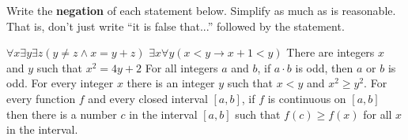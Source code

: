 \documentclass[11pt]{exam}
\def\and{\wedge}
\def\imp{\rightarrow}
\begin{document}

Write the \textbf{negation} of each statement below.  Simplify as much as is reasonable.  That is, don't just write ``it is false that...'' followed by the statement.
\begin{questions}
\question $\forall x \exists y \exists z (y \ne z \and x = y + z)$
\vfill
\question $\exists x \forall y (x < y \imp x + 1 < y)$
\vfill
\question There are integers $x$ and $y$ such that $x^2 = 4y + 2$
\vfill
\question For all integers $a$ and $b$, if $a\cdot b$ is odd, then $a$ or $b$ is odd.
\vfill
\question For every integer $x$ there is an integer $y$ such that $x < y$ and $x^2 \ge y^2$.
\vfill
\question For every function $f$ and every closed interval $[a,b]$, if $f$ is continuous on $[a,b]$ then there is a number $c$ in the interval $[a,b]$ such that $f(c) \ge f(x)$ for all $x$ in the interval.
\vfill
\end{questions}
\end{document}
